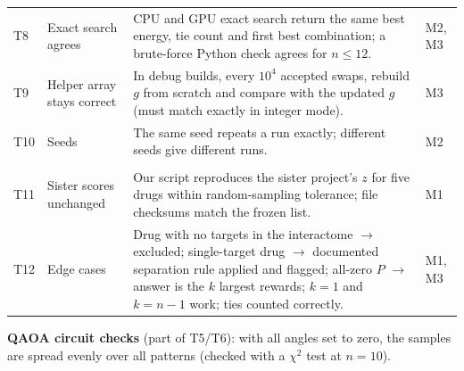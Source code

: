 \begin{longtable}{>{\raggedright\arraybackslash}p{0.7cm}>{\raggedright\arraybackslash}p{3.4cm}>{\raggedright\arraybackslash}p{8.0cm}>{\raggedright\arraybackslash}p{1.2cm}}
T8 & Exact search agrees & CPU and GPU exact search return the same best energy, tie count and first best combination; a brute-force Python check agrees for $n\le 12$. & M2, M3 \\
T9 & Helper array stays correct & In debug builds, every $10^4$ accepted swaps, rebuild $g$ from scratch and compare with the updated $g$ (must match exactly in integer mode). & M3 \\
T10 & Seeds & The same seed repeats a run exactly; different seeds give different runs. & M2 \\
\multicolumn{4}{l}{\textit{Data}} \\
T11 & Sister scores unchanged & Our script reproduces the sister project's $z$ for five drugs within random-sampling tolerance; file checksums match the frozen list. & M1 \\
T12 & Edge cases & Drug with no targets in the interactome $\to$ excluded; single-target drug $\to$ documented separation rule applied and flagged; all-zero $P$ $\to$ answer is the $k$ largest rewards; $k=1$ and $k=n-1$ work; ties counted correctly. & M1, M3 \\
\bottomrule
\end{longtable}

\textbf{QAOA circuit checks} (part of T5/T6): with all angles set to zero, the samples are spread evenly over all patterns (checked with a $\chi^2$ test at $n=10$).
